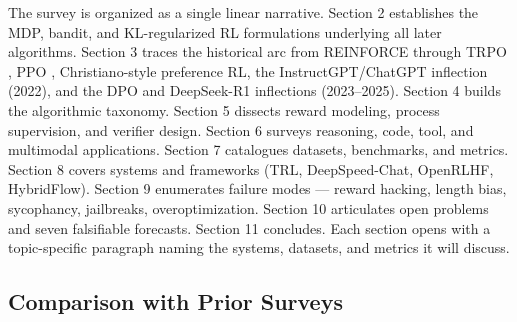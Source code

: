 \documentclass{article}
\begin{document}
The survey is organized as a single linear narrative. Section 2 establishes the MDP, bandit, and KL-regularized RL formulations underlying all later algorithms. Section 3 traces the historical arc from REINFORCE \citep{williams1992simplestatisticalg} through TRPO \citep{schulman2015trustregionpolicyo}, PPO \citep{schulman2017proximalpolicyopti}, Christiano-style preference RL, the InstructGPT/ChatGPT inflection (2022), and the DPO and DeepSeek-R1 inflections (2023--2025). Section 4 builds the algorithmic taxonomy. Section 5 dissects reward modeling, process supervision, and verifier design. Section 6 surveys reasoning, code, tool, and multimodal applications. Section 7 catalogues datasets, benchmarks, and metrics. Section 8 covers systems and frameworks (TRL, DeepSpeed-Chat, OpenRLHF, HybridFlow). Section 9 enumerates failure modes --- reward hacking, length bias, sycophancy, jailbreaks, overoptimization. Section 10 articulates open problems and seven falsifiable forecasts. Section 11 concludes. Each section opens with a topic-specific paragraph naming the systems, datasets, and metrics it will discuss.

\subsection{Comparison with Prior Surveys}\label{comparison-with-prior-surveys}
\end{document}
